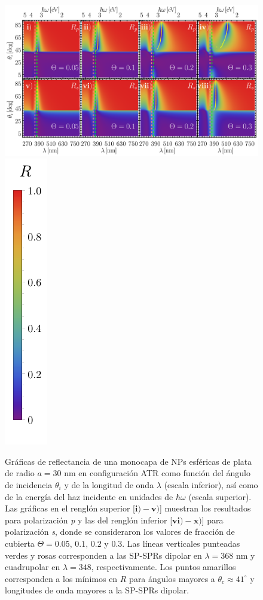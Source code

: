 \begin{figure}[h!]\centering
\includegraphics[width = .875\linewidth]{2-Resultados/figs/7-AgThetaVar/0-2D_Grid}%
\includegraphics[scale=1, trim={00 -5 00 00}, clip]{2-Resultados/figs/0-RBar_v}\vspace*{-.5em}
	\caption{Gráficas de reflectancia de una monocapa de NPs esféricas de plata de radio $a=30$ nm en configuración ATR como función del ángulo de incidencia $\theta_i$ y de la longitud de onda $\lambda$ (escala inferior), así como de la energía del haz incidente en unidades de $\hbar\omega$ (escala superior).  Las gráficas   en el renglón superior [$\mathbf{i)-v)}$] muestran los resultados para  polarización \emph{p} y las del renglón inferior  [$\mathbf{vi)-x)}$]  para polarización  \emph{s}, donde se consideraron los valores de fracción de cubierta $\Theta = 0.05,\,0.1,\,0.2$ y $0.3$.  Las líneas verticales punteadas verdes y rosas corresponden a las SP-SPRs dipolar en $\lambda=368$ nm y  cuadrupolar en $\lambda=348$, respectivamente.  Los puntos amarillos corresponden a los mínimos en $R$ para ángulos mayores a $\theta_c\approx 41^\circ$ y longitudes de onda mayores a la SP-SPRs dipolar.
}	\label{fig:Ag-R-Theta}	
	\end{figure}	

